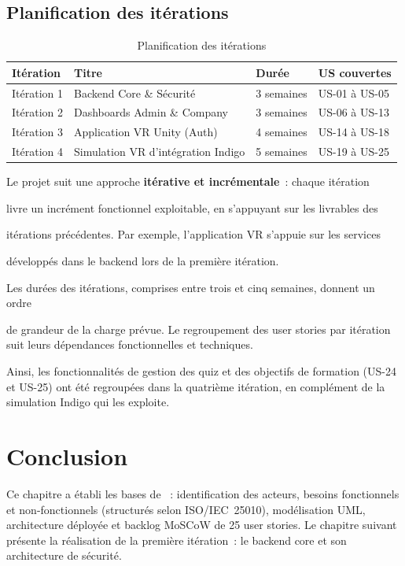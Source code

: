 \subsection{Planification des itérations}

\begin{table}[H]
  \centering
  \begin{tabular}{llll}
    \toprule
    \textbf{Itération} & \textbf{Titre} & \textbf{Durée} & \textbf{US couvertes} \\
    \midrule
    Itération 1 & Backend Core \& Sécurité          & 3 semaines & US-01 à US-05 \\
    Itération 2 & Dashboards Admin \& Company        & 3 semaines & US-06 à US-13 \\
    Itération 3 & Application VR Unity (Auth)        & 4 semaines & US-14 à US-18 \\
    Itération 4 & Simulation VR d'intégration Indigo & 5 semaines & US-19 à US-25 \\
    \bottomrule
  \end{tabular}
  \caption{Planification des itérations}
  \label{tab:sprint_plan}
\end{table}

\begin{notebox}

  Le projet suit une approche \textbf{itérative et incrémentale}~: chaque itération

  livre un incrément fonctionnel exploitable, en s'appuyant sur les livrables des

  itérations précédentes. Par exemple, l'application VR s'appuie sur les services

  développés dans le backend lors de la première itération.

  Les durées des itérations, comprises entre trois et cinq semaines, donnent un ordre

  de grandeur de la charge prévue. Le regroupement des user stories par itération suit leurs
dépendances fonctionnelles et techniques.

Ainsi, les fonctionnalités de gestion des quiz et des objectifs de formation
(US-24 et US-25) ont été regroupées dans la quatrième itération, en complément
de la simulation Indigo qui les exploite.

\end{notebox}

\section{Conclusion}

Ce chapitre a établi les bases de \tynassit{}~: identification des acteurs, besoins
fonctionnels et non-fonctionnels (structurés selon ISO/IEC~25010), modélisation UML,
architecture déployée et backlog MoSCoW de 25 user stories. Le chapitre suivant présente
la réalisation de la première itération~: le backend core et son architecture de sécurité.
